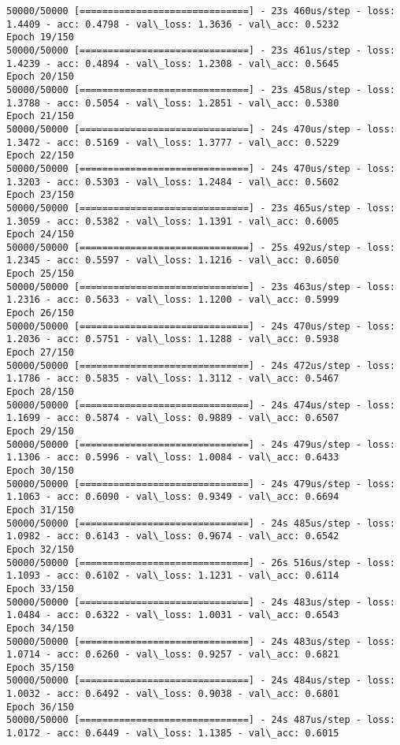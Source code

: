 \documentclass[11pt]{article}
\begin{document}
\begin{Verbatim}[commandchars=\\\{\}]
50000/50000 [==============================] - 23s 460us/step - loss: 1.4409 - acc: 0.4798 - val\_loss: 1.3636 - val\_acc: 0.5232
Epoch 19/150
50000/50000 [==============================] - 23s 461us/step - loss: 1.4239 - acc: 0.4894 - val\_loss: 1.2308 - val\_acc: 0.5645
Epoch 20/150
50000/50000 [==============================] - 23s 458us/step - loss: 1.3788 - acc: 0.5054 - val\_loss: 1.2851 - val\_acc: 0.5380
Epoch 21/150
50000/50000 [==============================] - 24s 470us/step - loss: 1.3472 - acc: 0.5169 - val\_loss: 1.3777 - val\_acc: 0.5229
Epoch 22/150
50000/50000 [==============================] - 24s 470us/step - loss: 1.3203 - acc: 0.5303 - val\_loss: 1.2484 - val\_acc: 0.5602
Epoch 23/150
50000/50000 [==============================] - 23s 465us/step - loss: 1.3059 - acc: 0.5382 - val\_loss: 1.1391 - val\_acc: 0.6005
Epoch 24/150
50000/50000 [==============================] - 25s 492us/step - loss: 1.2345 - acc: 0.5597 - val\_loss: 1.1216 - val\_acc: 0.6050
Epoch 25/150
50000/50000 [==============================] - 23s 463us/step - loss: 1.2316 - acc: 0.5633 - val\_loss: 1.1200 - val\_acc: 0.5999
Epoch 26/150
50000/50000 [==============================] - 24s 470us/step - loss: 1.2036 - acc: 0.5751 - val\_loss: 1.1288 - val\_acc: 0.5938
Epoch 27/150
50000/50000 [==============================] - 24s 472us/step - loss: 1.1786 - acc: 0.5835 - val\_loss: 1.3112 - val\_acc: 0.5467
Epoch 28/150
50000/50000 [==============================] - 24s 474us/step - loss: 1.1699 - acc: 0.5874 - val\_loss: 0.9889 - val\_acc: 0.6507
Epoch 29/150
50000/50000 [==============================] - 24s 479us/step - loss: 1.1306 - acc: 0.5996 - val\_loss: 1.0084 - val\_acc: 0.6433
Epoch 30/150
50000/50000 [==============================] - 24s 479us/step - loss: 1.1063 - acc: 0.6090 - val\_loss: 0.9349 - val\_acc: 0.6694
Epoch 31/150
50000/50000 [==============================] - 24s 485us/step - loss: 1.0982 - acc: 0.6143 - val\_loss: 0.9674 - val\_acc: 0.6542
Epoch 32/150
50000/50000 [==============================] - 26s 516us/step - loss: 1.1093 - acc: 0.6102 - val\_loss: 1.1231 - val\_acc: 0.6114
Epoch 33/150
50000/50000 [==============================] - 24s 483us/step - loss: 1.0484 - acc: 0.6322 - val\_loss: 1.0031 - val\_acc: 0.6543
Epoch 34/150
50000/50000 [==============================] - 24s 483us/step - loss: 1.0714 - acc: 0.6260 - val\_loss: 0.9257 - val\_acc: 0.6821
Epoch 35/150
50000/50000 [==============================] - 24s 484us/step - loss: 1.0032 - acc: 0.6492 - val\_loss: 0.9038 - val\_acc: 0.6801
Epoch 36/150
50000/50000 [==============================] - 24s 487us/step - loss: 1.0172 - acc: 0.6449 - val\_loss: 1.1385 - val\_acc: 0.6015

\end{Verbatim}
\end{document}

